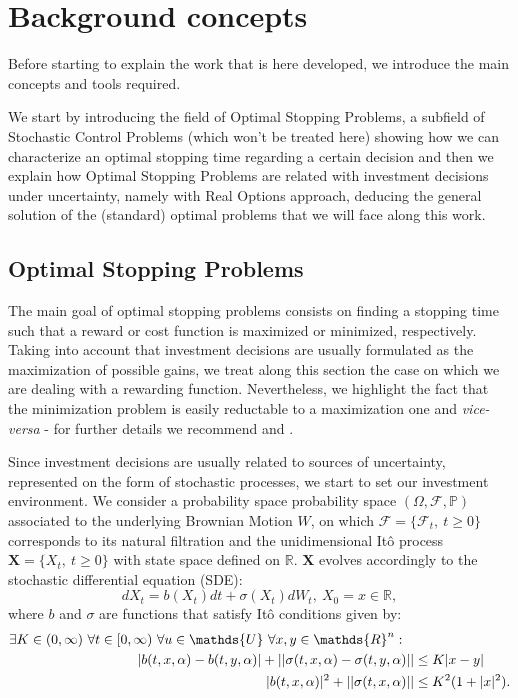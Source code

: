 \chapter{Background concepts}
\label{chapter:bc}

Before starting to explain the work that is here developed, we introduce the main concepts and tools required.

We start by introducing the field of Optimal Stopping Problems, a subfield of Stochastic Control Problems (which won't be treated here) showing how we can characterize an optimal stopping time regarding a certain decision and then we explain how Optimal Stopping Problems are related with investment decisions under uncertainty, namely with Real Options approach, deducing the general solution of the (standard) optimal problems that we will face along this work.

\section{Optimal Stopping Problems}
\label{section:osp}

The main goal of optimal stopping problems consists on finding a stopping time such that a reward or cost function is maximized or minimized, respectively. Taking into account that investment decisions are usually formulated as the maximization of possible gains, we treat along this section the case on which we are dealing with a rewarding function. Nevertheless, we highlight the fact that the minimization problem is easily reductable to a maximization one and \textit{vice-versa} - for further details we recommend \cite{ross} and \cite{oksendal:book}.

Since investment decisions are usually related to sources of uncertainty, represented on the form of stochastic processes, we start to set our investment environment. We consider a probability space probability space $(\Omega,\mathcal{F}, \mathds{P})$ associated to the underlying Brownian Motion $W$, on which $\mathcal{F}=\{\mathcal{F}_t, \ t\geq0 \}$ corresponds to its natural filtration and the unidimensional Itô process $\textbf{X}=\{ X_t, \ t \geq0 \}$ with state space defined on $\mathds{R}$. $\textbf{X}$ evolves accordingly to the stochastic differential equation (SDE):
\begin{equation}
d X_t=b(X_t)dt + \sigma (X_t)dW_t, \ X_0=x\in \mathds{R},
\label{bc_sde}
\end{equation} 
where $b$ and $\sigma$ are functions that satisfy Itô conditions given by:
\begin{align}
\exists K \in (0,\infty) \  \forall t \in [0,\infty) \ \forall u \in \mathds{U} \ \forall x,y \in\mathds{R}^n: \hspace{3mm} \nonumber &\\
|b(t,x,\alpha)-b(t,y,\alpha)| + || \sigma (t,x,\alpha)- \sigma(t,y,\alpha)|| &\leq K |x-y| \label{bc_cond1} \\
|b(t,x,\alpha)|^2+|| \sigma (t,x,\alpha)|| &\leq K^2 (1+|x|^2).  \label{bc_cond2}
\end{align}

